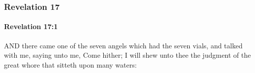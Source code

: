 			\begin{framed}
			\scriptsize
				\begin{compactdesc}
					\item[SBLG] 
				\end{compactdesc}
			\end{framed}

	\subsubsection{Revelation 17} %
		\label{REVELATIONNT-17}
		
		\paragraph{Revelation 17:1} %
			\label{REVELATIONNT-17-1}

			AND there came one of the seven angels which had the seven vials, and talked with me, saying unto me, Come hither; I will shew unto thee the judgment of the great whore that sitteth upon many waters:

